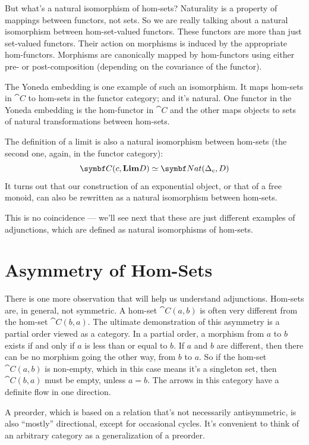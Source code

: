 But what's a natural isomorphism of hom-sets? Naturality is a property
of mappings between functors, not sets. So we are really talking about a
natural isomorphism between hom-set-valued functors. These functors are
more than just set-valued functors. Their action on morphisms is induced
by the appropriate hom-functors. Morphisms are canonically mapped by
hom-functors using either pre- or post-composition (depending on the
covariance of the functor).

The Yoneda embedding is one example of such an isomorphism. It maps
hom-sets in $\cat{C}$ to hom-sets in the functor category; and it's
natural. One functor in the Yoneda embedding is the hom-functor in
$\cat{C}$ and the other maps objects to sets of natural transformations
between hom-sets.

The definition of a limit is also a natural isomorphism between hom-sets
(the second one, again, in the functor category):
\[\cat{C}(c, \Lim[D]) \simeq \cat{Nat}(\Delta_c, D)\]
It turns out that our construction of an exponential object, or that of
a free monoid, can also be rewritten as a natural isomorphism between
hom-sets.

This is no coincidence --- we'll see next that these are just different
examples of adjunctions, which are defined as natural isomorphisms of
hom-sets.

\section{Asymmetry of Hom-Sets}

There is one more observation that will help us understand adjunctions.
Hom-sets are, in general, not symmetric. A hom-set $\cat{C}(a, b)$ is
often very different from the hom-set $\cat{C}(b, a)$. The ultimate
demonstration of this asymmetry is a partial order viewed as a category.
In a partial order, a morphism from $a$ to $b$ exists if
and only if $a$ is less than or equal to $b$. If
$a$ and $b$ are different, then there can be no morphism
going the other way, from $b$ to $a$. So if the hom-set
$\cat{C}(a, b)$ is non-empty, which in this case means it's a
singleton set, then $\cat{C}(b, a)$ must be empty, unless
$a = b$. The arrows in this category have a definite flow in
one direction.

A preorder, which is based on a relation that's not necessarily
antisymmetric, is also ``mostly'' directional, except for occasional
cycles. It's convenient to think of an arbitrary category as a
generalization of a preorder.

